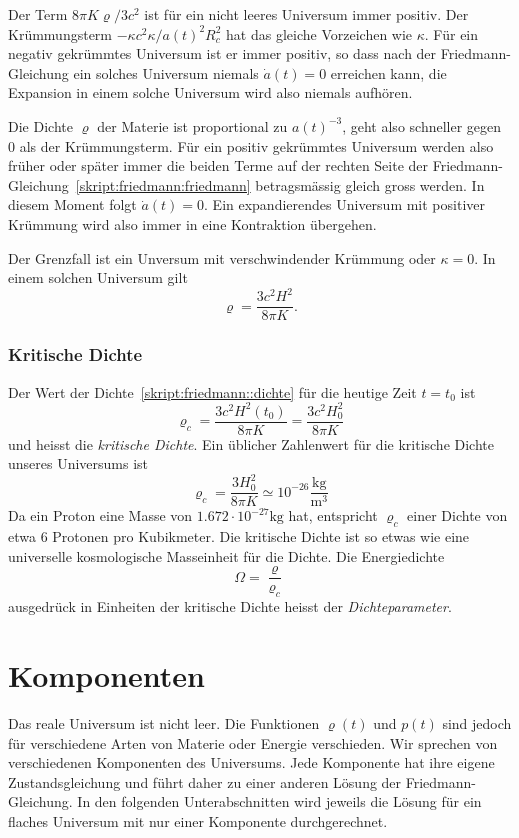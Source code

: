 Der Term $8\pi K\varrho/3c^2$ ist für ein nicht leeres Universum
immer positiv.
Der Krümmungsterm $-\kappa c^2\kappa/a(t)^2R_c^2$ hat das gleiche Vorzeichen
wie $\kappa$.
Für ein negativ gekrümmtes Universum ist er immer positiv, so dass
nach der Friedmann-Gleichung ein solches Universum niemals $\dot a(t)=0$
erreichen kann, die Expansion in einem solche Universum wird also
niemals aufhören.

Die Dichte $\varrho$ der Materie ist proportional zu $a(t)^{-3}$, geht
also schneller gegen $0$ als der Krümmungsterm.
Für ein positiv gekrümmtes Universum werden also früher oder später immer
die beiden Terme auf der rechten Seite der
Friedmann-Gleichung~\eqref{skript:friedmann:friedmann}
betragsmässig gleich gross werden.
In diesem Moment folgt $\dot a(t) = 0$.
Ein expandierendes Universum mit positiver Krümmung wird also immer in eine 
Kontraktion übergehen.

Der Grenzfall ist ein Unversum mit verschwindender Krümmung oder $\kappa=0$.
In einem solchen Universum gilt
\begin{equation}
\varrho = \frac{3c^2H^2}{8\pi K}.
\label{skript:friedmann::dichte}
\end{equation}

\subsubsection{Kritische Dichte}
Der Wert der Dichte~\eqref{skript:friedmann::dichte}
für die heutige Zeit $t=t_0$ ist
\[
\varrho_c = \frac{3c^2H^2(t_0)}{8\pi K}=\frac{3c^2H_0^2}{8\pi K}
\]
und heisst die {\em kritische Dichte}.
Ein üblicher Zahlenwert für die kritische Dichte unseres Universums ist
\[
\varrho_c = \frac{3H_0^2}{8\pi K}\simeq 10^{-26}\frac{\text{kg}}{\text{m}^3}
\]
Da ein Proton eine Masse von $1.672\cdot 10^{-27}\text{kg}$ hat, entspricht
$\varrho_c$ einer Dichte von etwa $6$ Protonen pro Kubikmeter.
Die kritische Dichte ist so etwas wie eine universelle kosmologische
Masseinheit für die Dichte.
Die Energiedichte
\[
\Omega=\frac{\varrho}{\varrho_c}
\]
ausgedrück in Einheiten der kritische Dichte heisst
der {\em Dichteparameter}.

\section{Komponenten}
Das reale Universum ist nicht leer.
Die Funktionen $\varrho(t)$ und $p(t)$ sind jedoch für verschiedene
Arten von Materie oder Energie verschieden.
Wir sprechen von verschiedenen Komponenten des Universums.
Jede Komponente hat ihre eigene Zustandsgleichung und führt
daher zu einer anderen Lösung der Friedmann-Gleichung.
In den folgenden Unterabschnitten wird jeweils die Lösung für
ein flaches Universum mit nur einer Komponente durchgerechnet.


